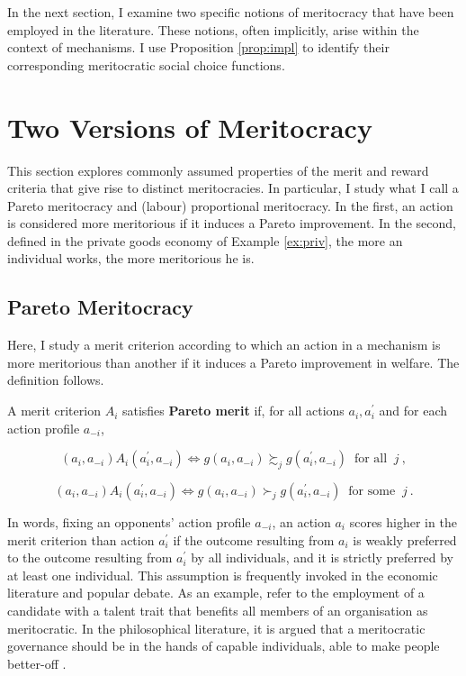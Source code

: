 In the next section, I examine two specific notions of meritocracy that have been employed in the literature. These notions, often implicitly, arise within the context of mechanisms. I use Proposition \ref{prop:impl} to identify their corresponding meritocratic social choice functions.

\section{Two Versions of Meritocracy}\label{sec:priv}

This section explores commonly assumed properties of the merit and reward criteria that give rise to distinct meritocracies. In particular, I study what I call a Pareto meritocracy and (labour) proportional meritocracy. In the first, an action is considered more meritorious if it induces a Pareto improvement. In the second, defined in the private goods economy of Example \ref{ex:priv}, the more an individual works, the more meritorious he is.

\subsection{Pareto Meritocracy}\label{subsec:pareto}

Here, I study a merit criterion according to which an action in a mechanism is more meritorious than another if it induces a Pareto improvement in welfare. The definition follows.

\begin{definition}\label{def:pareto}
	A merit criterion \( A_i \) satisfies \textbf{Pareto merit} if, for all actions \( a_i, a_i^{\prime} \) and for each action profile \( a_{-i} \),

	\[ ( a_i, a_{-i} ) A_i ( a^{\prime}_i, a_{-i} ) \iff g ( a_i, a_{-i} ) \succsim_j  g ( a^{\prime}_i, a_{-i} ) \: \text{ for all } \: j \: , \]

	\[ ( a_i, a_{-i} ) A_i ( a^{\prime}_i, a_{-i} ) \iff g ( a_i, a_{-i} ) \succ_j  g ( a^{\prime}_i, a_{-i} ) \: \text{ for some } \: j \: .\]
\end{definition}

In words, fixing an opponents' action profile \( a_{-i} \), an action \( a_i \) scores higher in the merit criterion than action \( a^{\prime}_{i} \) if the outcome resulting from \( a_i \) is weakly preferred to the outcome resulting from \( a^{\prime}_{i} \) by all individuals, and it is strictly preferred by at least one individual. This assumption is frequently invoked in the economic literature and popular debate. As an example, \cite{moissonCooptationMeritocracyVs2024} refer to the employment of a candidate with a talent trait that benefits all members of an organisation as meritocratic. In the philosophical literature, it is argued that a meritocratic governance should be in the hands of capable individuals, able to make people better-off \citep{sep-meritocracy}.

